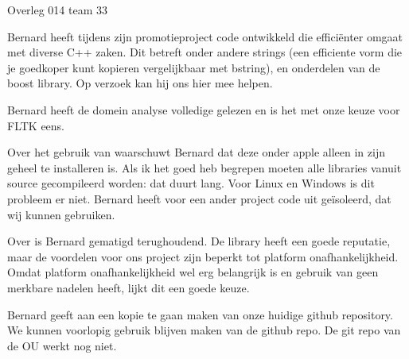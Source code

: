 \documentclass[a4paper,final]{article}
\begin{document}
\begin{Minutes}{Overleg 014 team 33}
\begin{description}
\end{description}



Bernard heeft tijdens zijn promotieproject code ontwikkeld die effici\"{e}nter
omgaat met diverse C++ zaken. Dit betreft onder andere strings (een efficiente
vorm die je goedkoper kunt kopieren vergelijkbaar met bstring), en onderdelen
van de boost library. Op verzoek kan hij ons hier mee helpen.


Bernard heeft de domein analyse volledige gelezen en is het met onze keuze voor
FLTK eens. 

 Over het gebruik van  waarschuwt Bernard dat deze onder
apple alleen in zijn geheel te installeren is. Als ik het goed heb begrepen
moeten alle  libraries vanuit source gecompileerd worden: dat duurt lang.
Voor Linux en Windows is dit probleem er niet. Bernard heeft voor een ander
project code uit  ge\"{i}soleerd, dat wij kunnen gebruiken.

 Over  is Bernard gematigd terughoudend. De library heeft een goede
reputatie, maar de voordelen voor ons project zijn beperkt tot platform onafhankelijkheid.
Omdat platform onafhankelijkheid wel erg belangrijk is en gebruik van  geen
merkbare nadelen heeft, lijkt dit een goede keuze.


Bernard geeft aan een kopie te gaan maken van onze huidige github repository. We kunnen 
voorlopig gebruik blijven maken van de github repo. De git repo van de OU werkt nog niet.


\end{Minutes}
\end{document}
